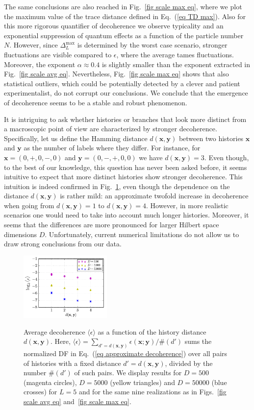 \documentclass[pre,twocolumn,10pt,aps,longbibliography,nofootinbib]{revtex4-1}
\newcommand{\bb}[1]{\textbf{#1}}
\newcommand{\lr}[1]{{\langle {#1}\rangle}}
\newcommand{\blue}[1]{#1}
\newcommand{\new}[1]{#1}
\begin{document}
The same conclusions are also reached in Fig.~\ref{fig scale max eq}, where we plot the maximum value of the trace
distance defined in Eq.~(\ref{eq TD max}). Also for this more rigorous quantifier of \new{decoherence} we observe
typicality and an exponential suppression of quantum effects as a function of the particle number $N$. However,
since $\Delta_L^\text{max}$ is determined by the worst case scenario, stronger fluctuations are visible compared to
$\epsilon$, where the average tames fluctuations. Moreover, the exponent $\alpha\approx0.4$ is slightly smaller than
the exponent extracted in Fig.~\ref{fig scale avg eq}. Nevertheless, Fig.~\ref{fig scale max eq} shows
that also statistical outliers, which could be potentially detected by a clever and patient experimentalist, do not
corrupt our conclusions. We conclude that the emergence of \new{decoherence} seems to be a stable and robust phenomenon.

\blue{It is intriguing to ask whether histories or branches that look more distinct from a macroscopic point of view are characterized by stronger decoherence. Specifically, let us define the Hamming distance $d(\bb x,\bb y)$ between two histories $\bb x$ and $\bb y$ as the number of labels where they differ. For instance, for $\bb x = (0,+,0,-,0)$ and $\bb y = (0,-,+,0,0)$ we have $d(\bb x,\bb y) = 3$. Even though, to the best of our knowledge, this question has never been asked before, it seems intuitive to expect that more distinct histories show stronger decoherence. This intuition is indeed confirmed in Fig.~\ref{fig distances}, even though the dependence on the distance $d(\bb x,\bb y)$ is rather mild: an approximate twofold increase in decoherence when going from $d(\bb x,\bb y) = 1$ to $d(\bb x,\bb y) = 4$. However, in more realistic scenarios one would need to take into account much longer histories. Moreover, it seems that the differences are more pronounced for larger Hilbert space dimensions $D$. Unfortunately, current numerical limitations do not allow us to draw strong conclusions from our data.}

\begin{figure}[t]
 \centering\includegraphics[width=0.40\textwidth,clip=true]{distances.pdf}
 \label{fig distances}
 \caption{\blue{Average decoherence $\lr{\epsilon}$ as a function of the history distance $d(\bb x,\bb y)$. Here, $\lr{\epsilon} = \sum_{d'=d(\bb x,\bb y)}\epsilon(\bb x;\bb y)/\#(d')$ sums the normalized DF in Eq.~(\ref{eq approximate decoherence}) over all pairs of histories with a fixed distance $d'=d(\bb x,\bb y)$, divided by the number $\#(d')$ of such pairs. We display results for $D=500$ (magenta circles), $D=5000$ (yellow triangles) and $D=50000$ (blue crosses) for $L=5$ and for the same nine realizations as in Figs.~\ref{fig scale avg eq} and~\ref{fig scale max eq}.} }
\end{figure}
\end{document}
